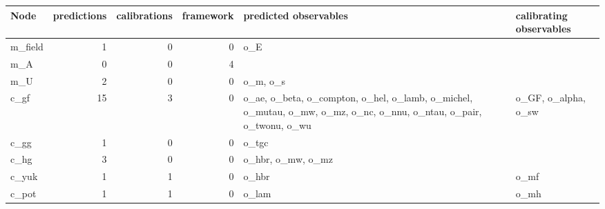 \begin{tabular}{@{}lrrrp{6.2cm}p{2.6cm}@{}}\toprule
Node & predictions & calibrations & framework & predicted observables & calibrating observables \\\midrule
m\_field & 1 & 0 & 0 & o\_E &  \\
m\_A & 0 & 0 & 4 &  &  \\
m\_U & 2 & 0 & 0 & o\_m, o\_s &  \\
c\_gf & 15 & 3 & 0 & o\_ae, o\_beta, o\_compton, o\_hel, o\_lamb, o\_michel, o\_mutau, o\_mw, o\_mz, o\_nc, o\_nnu, o\_ntau, o\_pair, o\_twonu, o\_wu & o\_GF, o\_alpha, o\_sw \\
c\_gg & 1 & 0 & 0 & o\_tgc &  \\
c\_hg & 3 & 0 & 0 & o\_hbr, o\_mw, o\_mz &  \\
c\_yuk & 1 & 1 & 0 & o\_hbr & o\_mf \\
c\_pot & 1 & 1 & 0 & o\_lam & o\_mh \\
\bottomrule\end{tabular}
